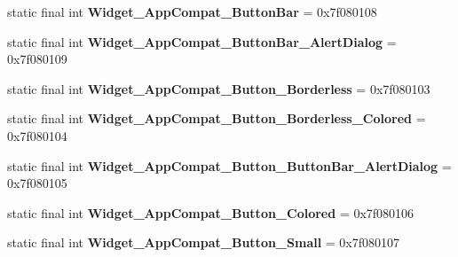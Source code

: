\begin{DoxyCompactItemize}
\item 
\hypertarget{classandroid_1_1support_1_1design_1_1_r_1_1style_ad4189a3152639a49105b220b6a35cb39}{}static final int {\bfseries Widget\+\_\+\+App\+Compat\+\_\+\+Button\+Bar} = 0x7f080108\label{classandroid_1_1support_1_1design_1_1_r_1_1style_ad4189a3152639a49105b220b6a35cb39}

\item 
\hypertarget{classandroid_1_1support_1_1design_1_1_r_1_1style_a1669094c1cf6c300843ff1c554d9d2ba}{}static final int {\bfseries Widget\+\_\+\+App\+Compat\+\_\+\+Button\+Bar\+\_\+\+Alert\+Dialog} = 0x7f080109\label{classandroid_1_1support_1_1design_1_1_r_1_1style_a1669094c1cf6c300843ff1c554d9d2ba}

\item 
\hypertarget{classandroid_1_1support_1_1design_1_1_r_1_1style_a6f73304db4302454d7a331fddc2d0b53}{}static final int {\bfseries Widget\+\_\+\+App\+Compat\+\_\+\+Button\+\_\+\+Borderless} = 0x7f080103\label{classandroid_1_1support_1_1design_1_1_r_1_1style_a6f73304db4302454d7a331fddc2d0b53}

\item 
\hypertarget{classandroid_1_1support_1_1design_1_1_r_1_1style_a2d2f9169d12a7058fde5ebccb9fdae07}{}static final int {\bfseries Widget\+\_\+\+App\+Compat\+\_\+\+Button\+\_\+\+Borderless\+\_\+\+Colored} = 0x7f080104\label{classandroid_1_1support_1_1design_1_1_r_1_1style_a2d2f9169d12a7058fde5ebccb9fdae07}

\item 
\hypertarget{classandroid_1_1support_1_1design_1_1_r_1_1style_a79f768ac5e0d81d2a2f6f9f64bd7c352}{}static final int {\bfseries Widget\+\_\+\+App\+Compat\+\_\+\+Button\+\_\+\+Button\+Bar\+\_\+\+Alert\+Dialog} = 0x7f080105\label{classandroid_1_1support_1_1design_1_1_r_1_1style_a79f768ac5e0d81d2a2f6f9f64bd7c352}

\item 
\hypertarget{classandroid_1_1support_1_1design_1_1_r_1_1style_a6e4a95d74c2cb6caf6c4bb7117fbae5e}{}static final int {\bfseries Widget\+\_\+\+App\+Compat\+\_\+\+Button\+\_\+\+Colored} = 0x7f080106\label{classandroid_1_1support_1_1design_1_1_r_1_1style_a6e4a95d74c2cb6caf6c4bb7117fbae5e}

\item 
\hypertarget{classandroid_1_1support_1_1design_1_1_r_1_1style_a7e35f1376266e8260468088a0dca3b78}{}static final int {\bfseries Widget\+\_\+\+App\+Compat\+\_\+\+Button\+\_\+\+Small} = 0x7f080107\label{classandroid_1_1support_1_1design_1_1_r_1_1style_a7e35f1376266e8260468088a0dca3b78}


\end{DoxyCompactItemize}

